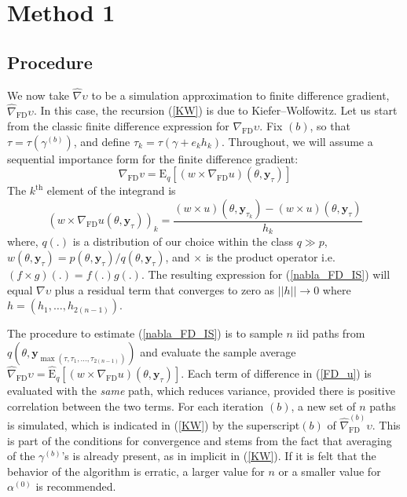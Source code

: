 \documentclass{article}
\begin{document}
\section{Method 1}\label{sec:meth:i}
\subsection{Procedure}
We now take $\widehat\nabla \upsilon$ to be a simulation
approximation to finite difference gradient,
$\widehat{\nabla}_{\mathrm{\scriptscriptstyle FD}} \upsilon$. In
this case, the recursion (\ref{KW}) is due to Kiefer--Wolfowitz. Let
us start from the classic finite difference expression for
$\nabla_{\mathrm{\scriptscriptstyle FD}} \upsilon$. Fix $(b)$, so
that $\tau=\tau(\gamma^{(b)})$, and define $\tau_k=\tau(\gamma+e_k
h_k)$. Throughout, we will assume a sequential importance form for
the finite difference gradient:
\begin{equation}\label{nabla_FD_IS}
\nabla_{\mathrm{\scriptscriptstyle FD}}v=\mathrm{E}_q[(w\times
\nabla_{\mathrm{\scriptscriptstyle FD}}
u)(\theta,\mathbf{y}_{\tau})]
\end{equation}
The $k^{\mathrm{th}}$ element of the integrand is
\begin{equation}\label{FD_u}
(w\times \nabla_\mathrm{\scriptscriptstyle FD}
u(\theta,\mathbf{y}_{\tau}))_k=\frac{(w\times
u)(\theta,\mathbf{y}_{\tau_k})-(w\times
u)(\theta,\mathbf{y}_{\tau})}{h_k}
\end{equation}where, $q(.)$ is a distribution of our
choice within the class $q\gg p$,
$w(\theta,\mathbf{y}_{\tau})=p(\theta,\mathbf{y}_{\tau})/q(\theta,\mathbf{y}_{\tau})$,
and $\times$ is the product operator i.e. $(f\times g)(.)=f(.)g(.)$.
The resulting expression for (\ref{nabla_FD_IS}) will equal $\nabla
\upsilon$ plus a residual term that converges to zero as
$||h||\rightarrow 0$ where $h=(h_1,\ldots,h_{2(n-1)})$.

The procedure to estimate (\ref{nabla_FD_IS}) is to sample $n$ iid
paths from
$q(\theta,\mathbf{y}_{\max(\tau,\tau_1,...,\tau_{2(n-1)})})$ and
evaluate the sample average
$\widehat{\nabla}_{\mathrm{\scriptscriptstyle FD}}
\upsilon=\widehat{\mathrm{E}}_q[(w\times
\nabla_{\mathrm{\scriptscriptstyle FD}}
u)(\theta,\mathbf{y}_{\tau})]$. Each term of difference in
(\ref{FD_u}) is evaluated with the \emph{same} path, which reduces
variance, provided there is positive correlation between the two
terms. For each iteration $(b)$, a new set of $n$ paths is
simulated, which is indicated in (\ref{KW}) by the superscript$(b)$
of $\widehat{\nabla}_{\mathrm{\scriptscriptstyle FD}}^{(b)}
\upsilon$. This is part of the conditions for convergence and stems
from the fact that averaging of the $\gamma^{(b)}$'s is already
present, as in implicit in (\ref{KW}). If it is felt that the
behavior of the algorithm is erratic, a larger value for $n$ or a
smaller value for $\alpha^{(0)}$ is recommended.
\end{document}
